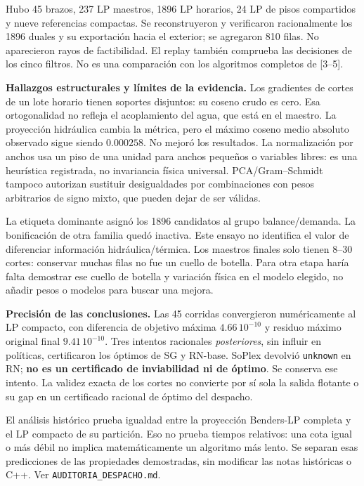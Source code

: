 \documentclass[10pt,a4paper]{article}
\begin{document}
Hubo 45 brazos, 237 LP maestros, 1896 LP horarios, 24 LP de pisos compartidos
y nueve referencias compactas. Se reconstruyeron y verificaron racionalmente
los 1896 duales y su exportación hacia el exterior; se agregaron 810 filas.
No aparecieron rayos de factibilidad. El replay también comprueba las decisiones
de los cinco filtros. No es una comparación con los algoritmos completos de [3--5].

\newpage
\textbf{Hallazgos estructurales y límites de la evidencia.}
Los gradientes de cortes de un lote horario tienen soportes disjuntos: su coseno
crudo es cero. Esa ortogonalidad no refleja el acoplamiento del agua, que está
en el maestro. La proyección hidráulica cambia la métrica, pero el máximo coseno
medio absoluto observado sigue siendo $0.000258$. No mejoró los resultados.
La normalización por anchos usa un piso de una unidad para anchos pequeños o
variables libres: es una heurística registrada, no invariancia física universal.
PCA/Gram--Schmidt tampoco autorizan sustituir desigualdades por combinaciones
con pesos arbitrarios de signo mixto, que pueden dejar de ser válidas.

La etiqueta dominante asignó los 1896 candidatos al grupo balance/demanda.
La bonificación de otra familia quedó inactiva. Este ensayo no identifica el
valor de diferenciar información hidráulica/térmica. Los maestros finales solo
tienen 8--30 cortes: conservar muchas filas no fue un cuello de botella.
Para otra etapa haría falta demostrar ese cuello de botella y variación física
en el modelo elegido, no añadir pesos o modelos para buscar una mejora.

\textbf{Precisión de las conclusiones.} Las 45 corridas convergieron
numéricamente al LP compacto, con diferencia de objetivo máxima
$4.66\,10^{-10}$ y residuo máximo original final $9.41\,10^{-10}$.
Tres intentos racionales \emph{posteriores}, sin influir en políticas, certificaron
los óptimos de SG y RN-base. SoPlex devolvió \texttt{unknown} en RN;
\textbf{no es un certificado de inviabilidad ni de óptimo}. Se conserva ese intento.
La validez exacta de los cortes no convierte por sí sola la salida flotante o
su gap en un certificado racional de óptimo del despacho.

El análisis histórico prueba igualdad entre la proyección Benders-LP completa
y el LP compacto de su partición. Eso no prueba tiempos relativos: una cota
igual o más débil no implica matemáticamente un algoritmo más lento.
Se separan esas predicciones de las propiedades demostradas, sin modificar
las notas históricas o C++. Ver \texttt{AUDITORIA\_DESPACHO.md}.
\end{document}
